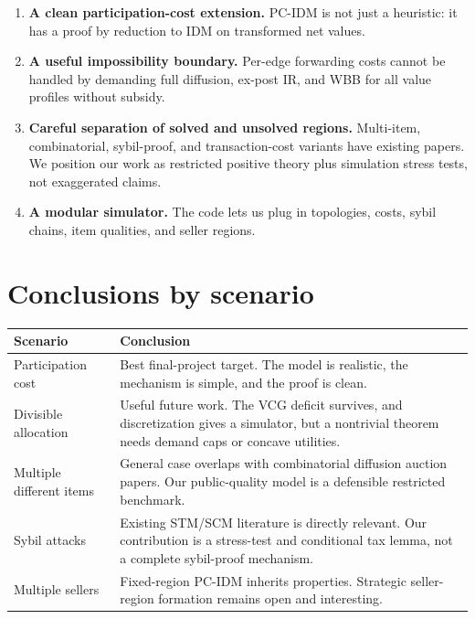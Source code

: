 \documentclass[11pt]{article}
\begin{document}
\begin{enumerate}[leftmargin=*]
    \item \textbf{A clean participation-cost extension.}  PC-IDM is not just a heuristic: it has a proof by reduction to IDM on transformed net values.
    \item \textbf{A useful impossibility boundary.}  Per-edge forwarding costs cannot be handled by demanding full diffusion, ex-post IR, and WBB for all value profiles without subsidy.
    \item \textbf{Careful separation of solved and unsolved regions.}  Multi-item, combinatorial, sybil-proof, and transaction-cost variants have existing papers.  We position our work as restricted positive theory plus simulation stress tests, not exaggerated claims.
    \item \textbf{A modular simulator.}  The code lets us plug in topologies, costs, sybil chains, item qualities, and seller regions.
\end{enumerate}

\section{Conclusions by scenario}

\begin{center}
\begin{tabularx}{0.96\textwidth}{p{}X}
\toprule
\textbf{Scenario} & \textbf{Conclusion}\\
\midrule
Participation cost & Best final-project target.  The model is realistic, the mechanism is simple, and the proof is clean.\\
Divisible allocation & Useful future work.  The VCG deficit survives, and discretization gives a simulator, but a nontrivial theorem needs demand caps or concave utilities.\\
Multiple different items & General case overlaps with combinatorial diffusion auction papers.  Our public-quality model is a defensible restricted benchmark.\\
Sybil attacks & Existing STM/SCM literature is directly relevant.  Our contribution is a stress-test and conditional tax lemma, not a complete sybil-proof mechanism.\\
Multiple sellers & Fixed-region PC-IDM inherits properties.  Strategic seller-region formation remains open and interesting.\\
\bottomrule
\end{tabularx}
\end{center}
\end{document}
